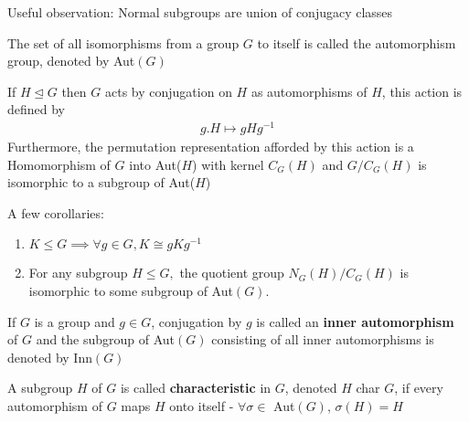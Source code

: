 \documentclass[titlepage, 12pt]{article}
\begin{document}
Useful observation: Normal subgroups are union of conjugacy classes

\begin{definition}{}{}
    The set of all isomorphisms from a group $G$ to itself is called the
    automorphism group, denoted by Aut$(G)$
\end{definition}

\begin{proposition}{}{}
    If $H\trianglelefteq G$ then $G$ acts by conjugation on $H$ as automorphisms
    of $H$, this action is defined by
    \begin{gather*}
        g.H\mapsto gHg^{-1}
    \end{gather*}
    Furthermore, the permutation representation afforded by this action is a
    Homomorphism of $G$ into Aut($H$) with kernel $C_G(H)$ and $G/C_G(H)$ is
    isomorphic to a subgroup of Aut($H$)
\end{proposition}
A few corollaries:
\begin{enumerate}
    \item $K\leq G\implies\forall g\in G, K\cong gKg^{-1}$
    \item For any subgroup $H\leq G,$ the quotient group $N_G(H)/C_G(H)$ is
        isomorphic to some subgroup of Aut$(G)$.
\end{enumerate}

\begin{definition}{}{}
    If $G$ is a group and $g\in G$, conjugation by $g$ is called an
    \textbf{inner automorphism} of $G$ and the subgroup of Aut$(G)$ consisting
    of all inner automorphisms is denoted by Inn$(G)$
\end{definition}


\begin{definition}{}{}
    A subgroup $H$ of $G$ is called \textbf{characteristic} in $G$, denoted $H$
    char $G$, if every automorphism of $G$ maps $H$ onto itself -
    $\forall\sigma\in$ Aut$(G)$, $\sigma(H) = H$
\end{definition}
\end{document}
